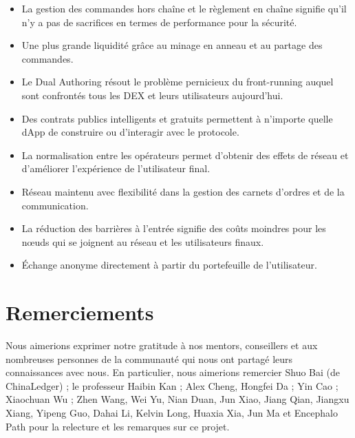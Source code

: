 \documentclass[UTF8,nofonts]{article}
\begin{document}
\begin{multicols}{2}
\begin{itemize}
	\item La gestion des commandes hors chaîne et le règlement en chaîne signifie qu'il n'y a pas de sacrifices en termes de performance pour la sécurité.
	\item Une plus grande liquidité grâce au minage en anneau et au partage des commandes.
	\item Le Dual Authoring résout le problème pernicieux du front-running auquel sont confrontés tous les DEX et leurs utilisateurs aujourd'hui.
	\item Des contrats publics intelligents et gratuits permettent à n'importe quelle dApp de construire ou d'interagir avec le protocole.
	\item La normalisation entre les opérateurs permet d'obtenir des effets de réseau et d'améliorer l'expérience de l'utilisateur final.
	\item Réseau maintenu avec flexibilité dans la gestion des carnets d’ordres et de la communication.
	\item La réduction des barrières à l'entrée signifie des coûts moindres pour les nœuds qui se joignent au réseau et les utilisateurs finaux.
	\item Échange anonyme directement à partir du portefeuille de l'utilisateur.
\end{itemize}

\section{Remerciements}
Nous aimerions exprimer notre gratitude à nos mentors, conseillers et aux nombreuses personnes de la communauté qui nous ont partagé leurs connaissances avec nous. En particulier, nous aimerions remercier Shuo Bai (de ChinaLedger) ; le professeur Haibin Kan ; Alex Cheng, Hongfei Da ; Yin Cao ; Xiaochuan Wu ; Zhen Wang, Wei Yu, Nian Duan, Jun Xiao, Jiang Qian, Jiangxu Xiang, Yipeng Guo, Dahai Li, Kelvin Long, Huaxia Xia, Jun Ma et Encephalo Path pour la relecture et les remarques sur ce projet. 






\end{multicols}
\end{document}
